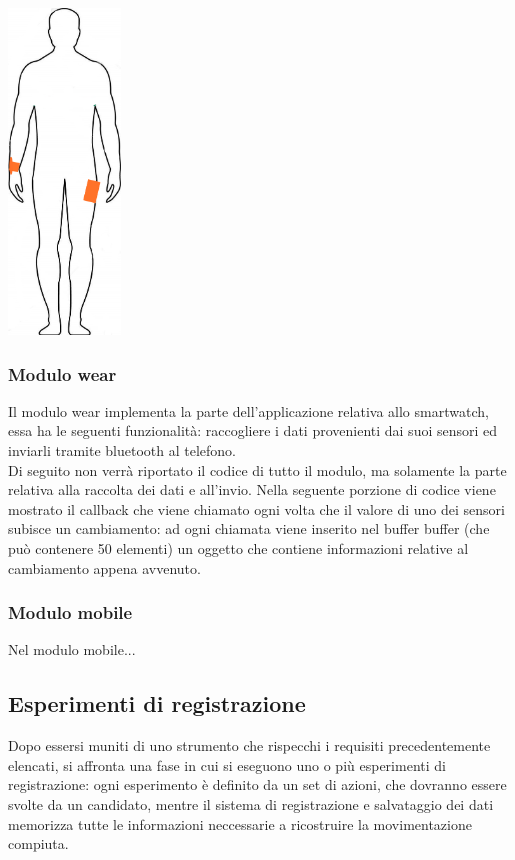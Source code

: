 \documentclass[a4paper]{article}
\begin{document}
\begin{center}
	\makebox[\linewidth]{}
	\includegraphics[width=30mm,scale=0.3]{./images/sagoma_phone_watch.jpg} 
\end{center} 

\subsubsection{Modulo wear}
Il modulo wear implementa la parte dell’applicazione relativa allo smartwatch, essa ha le seguenti funzionalità: raccogliere i dati provenienti dai suoi sensori ed inviarli tramite bluetooth al telefono.\\
Di seguito non verrà riportato il codice di tutto il modulo, ma solamente la parte relativa alla raccolta dei dati e all’invio.
Nella seguente porzione di codice viene mostrato il callback che viene chiamato ogni volta che il valore di uno dei sensori subisce un cambiamento: ad ogni chiamata viene inserito nel buffer buffer (che può contenere 50 elementi) un oggetto che contiene informazioni relative al cambiamento appena avvenuto.
\makebox[\linewidth]{}
\makebox[\linewidth]{}


\subsubsection{Modulo mobile}
Nel modulo mobile...

\makebox[\linewidth]{}


	\subsection{Esperimenti di registrazione}
Dopo essersi muniti di uno strumento che rispecchi i requisiti precedentemente elencati, si  affronta una fase in cui si eseguono uno o più esperimenti di registrazione: ogni esperimento è definito da un set di azioni, che dovranno essere svolte da un candidato, mentre il sistema di registrazione e salvataggio dei dati memorizza tutte le informazioni neccessarie a ricostruire la movimentazione compiuta.
\end{document}
